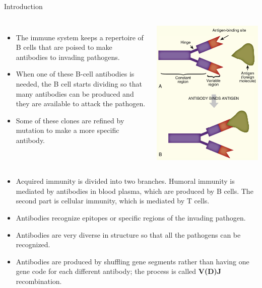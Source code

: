 \documentclass[11pt,dvipsnames,ignorenonframetext,aspectratio=169]{beamer}
\providecommand{\tightlist}{%
  \setlength{\itemsep}{0pt}\setlength{\parskip}{0pt}}
\begin{document}
\begin{frame}{Introduction}
\protect\hypertarget{introduction}{}

\begin{columns}[T,onlytextwidth]
  \small
  
  \begin{itemize}
  \item The immune system keeps a repertoire of B cells that are poised to make antibodies to invading pathogens. 
  \item When one of these B-cell antibodies is needed, the B cell starts dividing so that many antibodies can be produced and they are available to attack the pathogen. 
  \item Some of these clones are refined by mutation to make a more specific antibody.
  \end{itemize}
  
  

\begin{center}\includegraphics[width=0.5\linewidth]{./../images/antibody_antigen_recognition} \end{center}

\end{columns}

\end{frame}

\begin{frame}{}
\protect\hypertarget{section-13}{}

\begin{itemize}
\tightlist
\item
  Acquired immunity is divided into two branches. Humoral immunity is
  mediated by antibodies in blood plasma, which are produced by B cells.
  The second part is cellular immunity, which is mediated by T cells.
\item
  Antibodies recognize epitopes or specific regions of the invading
  pathogen.
\item
  Antibodies are very diverse in structure so that all the pathogens can
  be recognized.
\item
  Antibodies are produced by shuffling gene segments rather than having
  one gene code for each different antibody; the process is called
  \textbf{V(D)J} recombination.
\end{itemize}

\end{frame}
\end{document}
